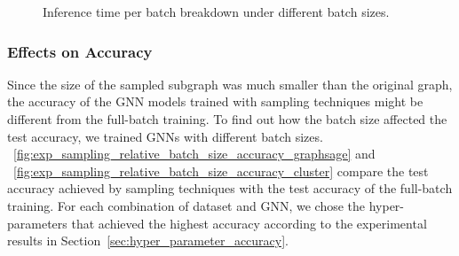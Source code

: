 \begin{figure}[H]
   \centering
   \caption{Inference time per batch breakdown under different batch sizes.}
   \label{fig:time_breakdown_of_inference_sampler}
\end{figure}

\subsubsection{Effects on Accuracy}

Since the size of the sampled subgraph was much smaller than the original graph, the accuracy of the GNN models trained with sampling techniques might be different from the full-batch training.
%
To find out how the batch size affected the test accuracy, we trained GNNs with different batch sizes.
%
\figurename~\ref{fig:exp_sampling_relative_batch_size_accuracy_graphsage} and \figurename~\ref{fig:exp_sampling_relative_batch_size_accuracy_cluster} compare the test accuracy achieved by sampling techniques with the test accuracy of the full-batch training.
%
For each combination of dataset and GNN, we chose the hyper-parameters that achieved the highest accuracy according to the experimental results in Section~\ref{sec:hyper_parameter_accuracy}.

